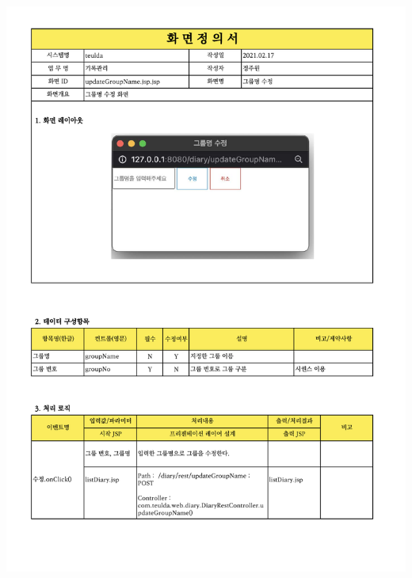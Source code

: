 {{{{{{{{{{{{{{{{{{{{{{{{{{{{{{{{{{{{{\includegraphics[width=20cm]{./Figure/Design/Display/diary/diary_19.pdf} \\
}}}}}}}}}}}}}}}}}}}}}}}}}}}}}}}}}}}}}
